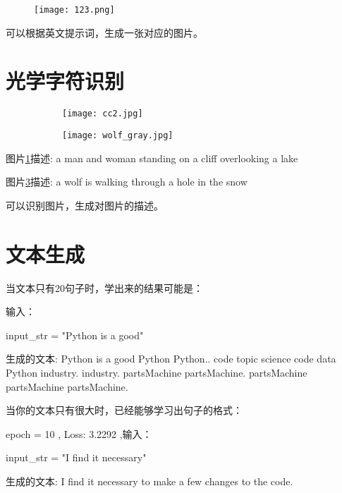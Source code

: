 \documentclass{article}
\begin{document}
\begin{figure}[h!]
    \centering
    \texttt{[image: 123.png]}

\end{figure}

可以根据英文提示词，生成一张对应的图片。


\newpage


\section{光学字符识别}




\begin{figure}[h!]
    \centering
    \begin{subfigure}{0.4\textwidth}
        \centering
        \texttt{[image: cc2.jpg]}
        \caption{}
        \label{fig:subfig3}
    \end{subfigure}
    \hfill
    \begin{subfigure}{0.4\textwidth}
        \centering  
        \texttt{[image: wolf\_gray.jpg]}
        \caption{}
        \label{fig:subfig4}
    \end{subfigure}

\end{figure}

图片\ref{fig:subfig3}描述: a man and woman standing on a cliff overlooking a lake

图片\ref{fig:subfig4}描述: a wolf is walking through a hole in the snow

可以识别图片，生成对图片的描述。

\section{文本生成}

当文本只有20句子时，学出来的结果可能是：

输入：

input\_str = "Python is a good"

生成的文本: Python is a good Python Python.. code topic science code data Python industry. industry. 
partsMachine partsMachine. partsMachine partsMachine partsMachine. 


当你的文本只有很大时，已经能够学习出句子的格式：

epoch = 10 , Loss: 3.2292 ,输入：

input\_str = "I find it necessary"

生成的文本: I find it necessary to make a few changes to the code.
\end{document}
